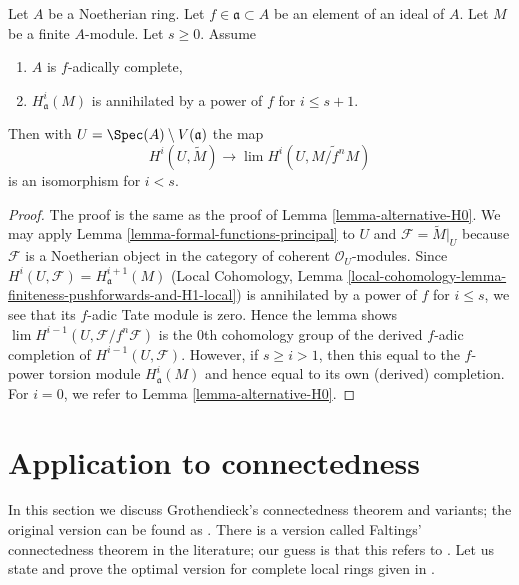 \begin{lemma}
\label{lemma-alternative-higher}
Let $A$ be a Noetherian ring. Let $f \in \mathfrak a \subset A$
be an element of an ideal of $A$. Let $M$ be a finite $A$-module.
Let $s \geq 0$. Assume
\begin{enumerate}
\item $A$ is $f$-adically complete,
\item $H^i_\mathfrak a(M)$ is annihilated by a power of $f$
for $i \leq s + 1$.
\end{enumerate}
Then with $U = \Spec(A) \setminus V(\mathfrak a)$ the map
$$
H^i(U, \widetilde{M})
\longrightarrow
\lim H^i(U, \widetilde{M/f^nM})
$$
is an isomorphism for $i < s$.
\end{lemma}

\begin{proof}
The proof is the same as the proof of Lemma \ref{lemma-alternative-H0}.
We may apply Lemma \ref{lemma-formal-functions-principal}
to $U$ and $\mathcal{F} = \widetilde{M}|_U$
because $\mathcal{F}$ is a Noetherian object in
the category of coherent $\mathcal{O}_U$-modules.
Since $H^i(U, \mathcal{F}) = H^{i + 1}_\mathfrak a(M)$
(Local Cohomology, Lemma
\ref{local-cohomology-lemma-finiteness-pushforwards-and-H1-local})
is annihilated by a power of $f$ for $i \leq s$, we see that
its $f$-adic Tate module is zero.
Hence the lemma shows $\lim H^{i - 1}(U, \mathcal{F}/f^n \mathcal{F})$
is the $0$th cohomology group of the
derived $f$-adic completion of $H^{i - 1}(U, \mathcal{F})$.
However, if $s \geq i > 1$, then this equal to the $f$-power torsion
module $H^i_\mathfrak a(M)$ and hence equal to its own
(derived) completion. For $i = 0$, we refer to
Lemma \ref{lemma-alternative-H0}.
\end{proof}





\section{Application to connectedness}
\label{section-connected}

\noindent
In this section we discuss Grothendieck's connectedness theorem
and variants; the original version can be found as
\cite[Exposee XIII, Theorem 2.1]{SGA2}. There is a version
called Faltings' connectedness theorem in the literature;
our guess is that this refers to \cite[Theorem 6]{Faltings-some}.
Let us state and prove the optimal version for complete
local rings given in \cite[Theorem 1.6]{Varbaro}.

